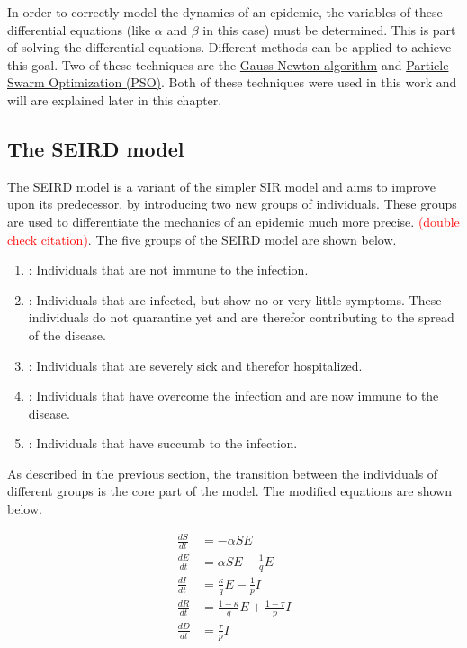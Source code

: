 In order to correctly model the dynamics of an epidemic, the variables of these differential
equations (like $\alpha$ and $\beta$ in this case) must be determined. This is part of solving the differential equations.
Different methods can be applied to achieve this goal. Two of these techniques are the \hyperref[sec:Gauss]{Gauss-Newton algorithm}\cite{Gauss??}
and \hyperref[sec:PSO]{Particle Swarm Optimization (PSO)}\cite{PSO??}. Both of these techniques were used in this work and will are explained
later in this chapter.


\subsection{The SEIRD model}
\label{sec:SEIRD}
The SEIRD model is a variant of the simpler SIR model\cite{knodel20173d} and aims to improve upon its predecessor, by
introducing two new groups of individuals. These groups are used to differentiate the mechanics of an epidemic much
more precise.
\textcolor{red}{(double check citation)}. %
The five groups of the SEIRD model are shown below.

\begin{enumerate}[label=$\bullet$]
	\item {}: Individuals that are not immune to the infection.
	\item {}: Individuals that are infected, but show no or very little symptoms. These individuals
		do not quarantine yet and are therefor contributing to the spread of the disease.
	\item {}: Individuals that are severely sick and therefor hospitalized.
	\item {}: Individuals that  have overcome the infection and are now immune to the disease.
	\item {}: Individuals that have succumb to the infection.
\end{enumerate}


As described in the previous section, the transition between the individuals of different groups is the core
part of the model. The modified equations are shown below.

\begin{align}
	\frac{dS}{dt} &= -\alpha S E \label{eq:SEIRD1_S} \\
	\frac{dE}{dt} &= \alpha S E -\frac{1}{q} E \label{eq:SEIRD1_E} \\
	\frac{dI}{dt} &= \frac{\kappa}{q} E - \frac{1}{p} I \label{eq:SEIRD1_I} \\
	\frac{dR}{dt} &= \frac{1-\kappa}{q} E + \frac{1-\tau}{p} I \label{eq:SEIRD1_R} \\
	\frac{dD}{dt} &= \frac{\tau}{p} I \label{eq:SEIRD1_D} 
\end{align}


